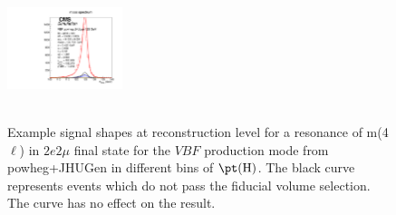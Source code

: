 \begin{figure}[htb]
\begin{center}
{      \includegraphics[width=0.3\textwidth,angle=0]{Figures/Appendix//VBF_powheg_JHUgen_125_2e2mu_pT4l_genbin4_recobin4_effs_genWeight*pileupWeight*dataMCWeight.pdf}
      \label{fig:sigfits-pT4l-VBF-powheg15-JHUgen-125-maintext:e}
    }
     \\
    \\
    \caption{ Example signal shapes at reconstruction level for a resonance of m(4$\ell$) in $2e2\mu$ final state for the $VBF$ production mode from {\sc powheg+JHUGen} in different bins of $\pt(\mathrm{H})$. The black curve represents events which do not pass the fiducial volume selection. The curve has no effect on the result.
    }
  \label{fig:sigfits-pT4l-VBF-powheg15-JHUgen-125-maintext}
 \end{center}
\end{figure} \clearpage

